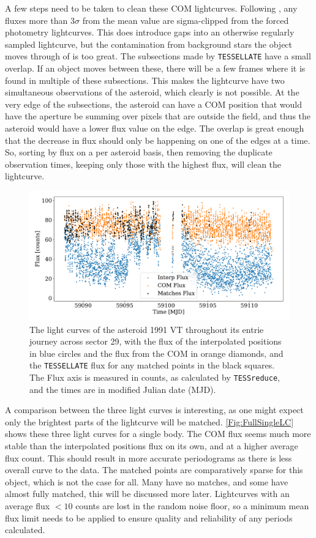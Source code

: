 \documentclass{UCreport}
\begin{document}
A few steps need to be taken to clean these COM lightcurves. 
Following \citet{McNeill2023}, any fluxes more than $3\sigma$ from the mean value are sigma-clipped from the forced photometry lightcurves.
This does introduce gaps into an otherwise regularly sampled lightcurve, but the contamination from background stars the object moves through of is too great.
The subsections made by \texttt{TESSELLATE} have a small overlap. 
If an object moves between these, there will be a few frames where it is found in multiple of these subsections.
This makes the lightcurve have two simultaneous observations of the asteroid, which clearly is not possible.
At the very edge of the subsections, the asteroid can have a COM position that would have the aperture be summing over pixels that are outside the field, and thus the asteroid would have a lower flux value on the edge.
The overlap is great enough that the decrease in flux should only be happening on one of the edges at a time.
So, sorting by flux on a per asteroid basis, then removing the duplicate observation times, keeping only those with the highest flux, will clean the lightcurve. 


\begin{figure}
  \centering
  \includegraphics[width =\textwidth]{../OzData/SingleBodyLC1991 VT.pdf}
  \caption[Light curves Example]{The light curves of the asteroid 1991 VT throughout its entrie journey across sector 29, with the flux of the interpolated positions in blue circles and the flux from the COM in orange diamonds, and the \texttt{TESSELLATE} flux for any matched points in the black squares.
    The Flux axis is measured in counts, as calculated by \texttt{TESSreduce}, and the times are in modified Julian date (MJD).}
  \label{Fig:FullSingleLC}
\end{figure}
A comparison between the three light curves is interesting, as one might expect only the brightest parts of the lightcurve will be matched.
\autoref{Fig:FullSingleLC} shows these three light curves for a single body.
The COM flux seems much more stable than the interpolated positions flux on its own, and at a higher average flux count.
This should result in more accurate periodograms as there is less overall curve to the data.
The matched points are comparatively sparse for this object, which is not the case for all.
Many have no matches, and some have almost fully matched, this will be discussed more later.
Lightcurves with an average flux $<10$ counts are lost in the random noise floor, so a minimum mean flux limit needs to be applied to ensure quality and reliability of any periods calculated.
\end{document}
